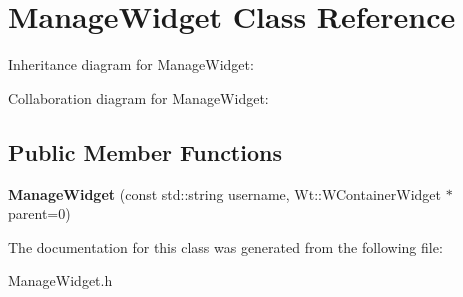 \hypertarget{classManageWidget}{}\section{Manage\+Widget Class Reference}
\label{classManageWidget}


Inheritance diagram for Manage\+Widget\+:


Collaboration diagram for Manage\+Widget\+:
\subsection*{Public Member Functions}
\begin{DoxyCompactItemize}
\item 
\mbox{\label{classManageWidget_acd05e0a585f5e09c9fdc6365a174fd2c}} 
{\bfseries Manage\+Widget} (const std\+::string username, Wt\+::\+W\+Container\+Widget $\ast$parent=0)
\end{DoxyCompactItemize}


The documentation for this class was generated from the following file\+:\begin{DoxyCompactItemize}
\item 
Manage\+Widget.\+h\end{DoxyCompactItemize}
